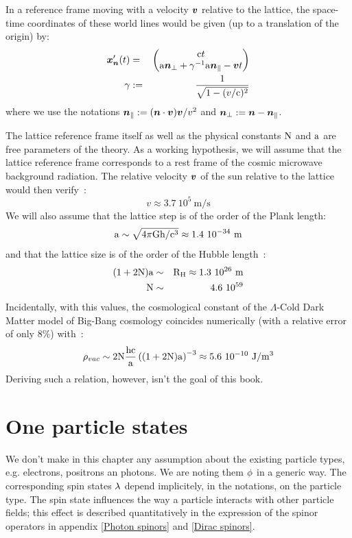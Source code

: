 \documentclass[10pt,a4paper,twoside,openany]{book}
\begin{document}
In a reference frame moving with a velocity $\sv v$ relative to the lattice, the space-time coordinates of these world lines would be given (up to a translation of the origin) by:
\begin{eqnarray*}
\wltp \n t & = & \matrix{\c t \\ \a  \n_\perp + \gamma^{-1} \a  \n_\parallel - \sv v t} \\
\gamma & \eqdef & \frac 1 {\sqrt{1 - (v / \c)^2}}
\end{eqnarray*}
where we use the notations $\n_\parallel \eqdef ( \n \ssp \sv v ) \sv v / v^2$ and $\n_\perp \eqdef \n - \n_\parallel$.

The lattice reference frame itself as well as the physical constants $\N$ and $\a$ are free parameters of the theory. As a working hypothesis, we will assume that the lattice reference frame corresponds to a rest frame of the cosmic microwave background radiation. The relative velocity $\sv v$ of the sun relative to the lattice would then verify~\cite{Kogut1993}:
\begin{equation*}
v \approx 3.7~10^5\ \mathrm m / \mathrm s
\end{equation*}
We will also assume that the lattice step is of the order of the Plank length:
\begin{equation*}
\a \sim \sqrt{4\pi\G \h/\c^3}\approx1.4~10^{-34}\ \mathrm m
\end{equation*}
and that the lattice size is of the order of the Hubble length~\cite{Freedman2001}:
\begin{eqnarray*}
(1+2 \N) \a & \sim & \RH\approx1.3\ 10^{26}\ \mathrm m\\
\N & \sim & 4.6~10^{59}
\end{eqnarray*}
Incidentally, with this values, the cosmological constant of the $\Lambda$-Cold Dark Matter model of Big-Bang cosmology coincides numerically (with a relative error of only 8\%) with~\cite{Komatsu2010}:
\begin{equation*}
\rho_{vac} \sim 2 \N \frac{\h \c}{\a} \left( ( 1 + 2 \N ) \a \right)^{-3} \approx 5.6~10^{-10}\ \mathrm J / \mathrm m^3
\end{equation*}
Deriving such a relation, however, isn't the goal of this book.

\section{One particle states}

 We don't make in this chapter any assumption about the existing particle types, e.g. electrons, positrons an photons. We are noting them $\pt$ in a generic way. The corresponding spin states $\sp$ depend implicitely, in the notations, on the particle type. The spin state influences the way a particle interacts with other particle fields; this effect is described quantitatively in the expression of the spinor operators in appendix \ref{Photon spinors} and \ref{Dirac spinors}.
\end{document}
